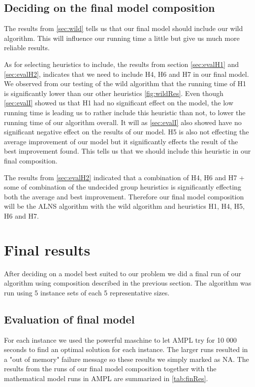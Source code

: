 \documentclass[../main.tex]{subfiles}
\begin{document}
\subsection{Deciding on the final model composition}
\label{sec:finComp}
The results from \cref{sec:wild} tells us that our final model should include our wild algorithm. 
This will influence our running time a little but give us much more reliable results.
\par
As for selecting heuristics to include, the results from section \cref{sec:evalH1} and \cref{sec:evalH2}, indicates that we need to include H4, H6 and H7 in our final model.
We observed from our testing of the wild algorithm that the running time of H1 is significantly lower than our other heuristics \cref{fig:wildRes}. Even though \cref{sec:evalI} showed us that H1 had no significant effect on the model, the low running time is leading us to rather include this heuristic than not, to lower the running time of our algorithm overall.
It will as \cref{sec:evalI} also showed have no significant negative effect on the results of our model.
H5 is also not effecting the average improvement of our model but it significantly effects the result of the best improvement found. This tells us that we should include this heuristic in our final composition. \par
The results from \cref{sec:evalH2} indicated that a combination of H4, H6 and H7 + some of combination of the undecided group heuristics is significantly effecting both the average and best improvement. Therefore our final model composition will be the ALNS algorithm with the wild algorithm and heuristics H1, H4, H5, H6 and H7.

\section{Final results}
\label{sec:evalFin}
After deciding on a model best suited to our problem we did a final run of our algorithm using composition described in the previous section.
The algorithm was run using 5 instance sets of each 5 representative sizes. 
\subsection{Evaluation of final model}
\label{sec:finRes}
For each instance we used the powerful maschine to let AMPL try for 10 000 seconds to find an optimal solution for each instance. 
The larger runs resulted in a "out of memory" failure message so these results we simply marked as NA.
The results from the runs of our final model composition together with the mathematical model runs in AMPL are summarized in \cref{tab:finRes}. 
\end{document}
